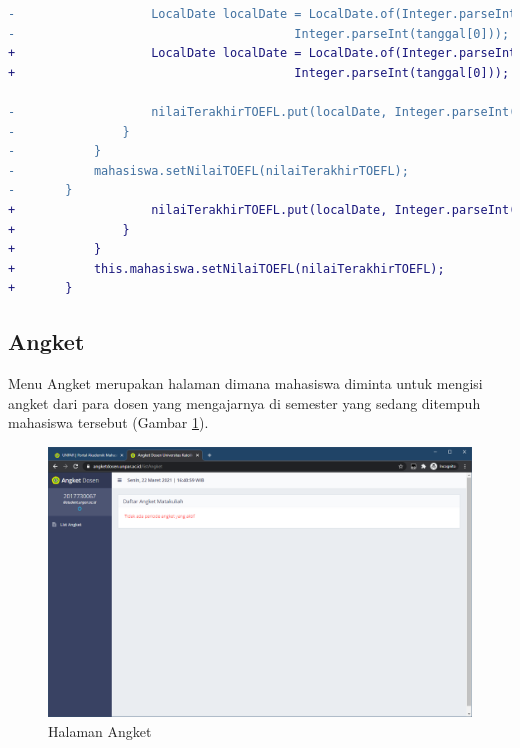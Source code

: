 \begin{itemize}
\begin{lstlisting}[language=diff, caption=Perubahan Implementasi Jsoup TOEFL, label=diff_toefl]
-                   LocalDate localDate = LocalDate.of(Integer.parseInt(tanggal[2]), Integer.parseInt(tanggal[1]),
-                                       Integer.parseInt(tanggal[0]));
+                   LocalDate localDate = LocalDate.of(Integer.parseInt(tanggal[2]), Integer.parseInt(tanggal[1]),
+                                       Integer.parseInt(tanggal[0]));

-                   nilaiTerakhirTOEFL.put(localDate, Integer.parseInt(nilai.text()));
-               }
-           }
-           mahasiswa.setNilaiTOEFL(nilaiTerakhirTOEFL);
-       }
+                   nilaiTerakhirTOEFL.put(localDate, Integer.parseInt(nilai.text()));
+               }
+           }
+           this.mahasiswa.setNilaiTOEFL(nilaiTerakhirTOEFL);
+       }
        \end{lstlisting}

    \end{itemize}
    
\subsection{Angket}
    Menu Angket merupakan halaman dimana mahasiswa diminta untuk mengisi angket dari para dosen yang mengajarnya di semester yang sedang ditempuh mahasiswa tersebut (Gambar \ref{fig:3_angket}).
        \begin{figure}[H]
        	\centering
        	\includegraphics[scale=0.45]{Gambar/angket.png}
        	\caption{Halaman Angket} 
        	\label{fig:3_angket}
        \end{figure}
        
